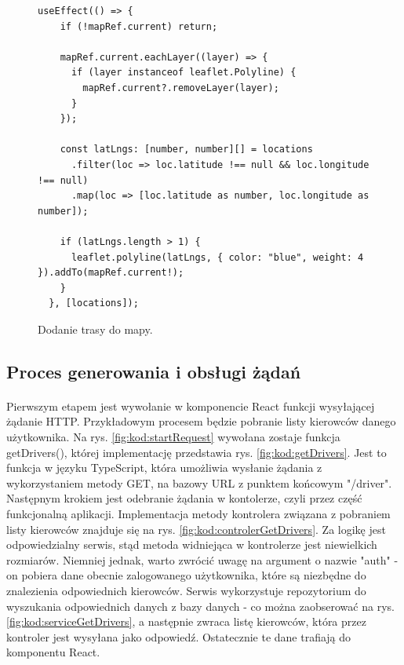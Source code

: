 \begin{figure}
\centering
\begin{lstlisting}
useEffect(() => {
    if (!mapRef.current) return;
  
    mapRef.current.eachLayer((layer) => {
      if (layer instanceof leaflet.Polyline) {
        mapRef.current?.removeLayer(layer);
      }
    });
  
    const latLngs: [number, number][] = locations
      .filter(loc => loc.latitude !== null && loc.longitude !== null)
      .map(loc => [loc.latitude as number, loc.longitude as number]);
  
    if (latLngs.length > 1) {
      leaflet.polyline(latLngs, { color: "blue", weight: 4 }).addTo(mapRef.current!);
    }
  }, [locations]);
\end{lstlisting}
\caption{Dodanie trasy do mapy.}
\label{fig:kod:polyline}
\end{figure}


\subsection{Proces generowania i obsługi żądań}
\paragraph{}
Pierwszym etapem jest wywołanie w komponencie React funkcji wysyłającej żądanie HTTP. Przykładowym procesem będzie pobranie listy kierowców danego użytkownika. Na rys. \ref{fig:kod:startRequest} wywołana zostaje funkcja getDrivers(), której implementację przedstawia rys. \ref{fig:kod:getDrivers}. Jest to funkcja w języku TypeScript, która umożliwia wysłanie żądania z wykorzystaniem metody GET, na bazowy URL z punktem końcowym "/driver". Następnym krokiem jest odebranie żądania w kontolerze, czyli przez część funkcjonalną aplikacji. Implementacja metody kontrolera związana z pobraniem listy kierowców znajduje się na rys. \ref{fig:kod:controlerGetDrivers}. Za logikę jest odpowiedzialny serwis, stąd metoda widniejąca w kontrolerze jest niewielkich rozmiarów. Niemniej jednak, warto zwrócić uwagę na argument o nazwie "auth" - on pobiera dane obecnie zalogowanego użytkownika, które są niezbędne do znalezienia odpowiednich kierowców. Serwis wykorzystuje repozytorium do wyszukania odpowiednich danych z bazy danych - co można zaobserować na rys. \ref{fig:kod:serviceGetDrivers}, a następnie zwraca listę kierowców, która przez kontroler jest wysyłana jako odpowiedź. Ostatecznie te dane trafiają do komponentu React.


